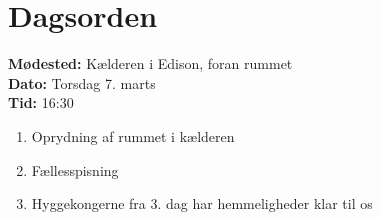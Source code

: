 

\newcommand{\meeting}{Oprydningsmøde}
\newcommand{\dato}{Torsdag 7. marts}
\newcommand{\tid}{16:30}
\newcommand{\location}{Kælderen i Edison, foran rummet}



\section*{Dagsorden}%
\textbf{Mødested:} \location{}\\
\textbf{Dato:} \dato{}\\
\textbf{Tid:} \tid{}

\begin{enumerate}
  \item Oprydning af rummet i kælderen
  \item Fællesspisning
  \item Hyggekongerne fra 3. dag har hemmeligheder klar til os
\end{enumerate}




